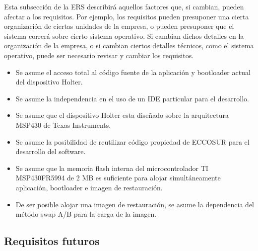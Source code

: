 \documentclass[12pt,a4paper]{article}
\begin{document}
Esta subsección de la ERS describirá aquellos factores que, si
cambian, pueden afectar a los requisitos. Por ejemplo, los
requisitos pueden presuponer una cierta organización de ciertas
unidades de la empresa, o pueden presuponer que  el sistema correrá
sobre cierto sistema operativo. Si cambian dichos detalles en la
organización de la empresa, o si cambian ciertos detalles técnicos,
como el sistema operativo, puede ser necesario revisar y cambiar los
requisitos.

\begin{itemize}
	\item Se asume el acceso total al código fuente de la aplicación y bootloader actual del dispositivo Holter.
	
	\item Se asume la independencia en el uso de un IDE particular para el desarrollo.

	\item Se asume que el dispositivo Holter esta diseñado sobre la arquitectura MSP430 de Texas Instruments.

	\item Se asume la posibilidad de reutilizar código propiedad de ECCOSUR para el desarrollo del software.

	\item Se asume que la memoria flash interna del microcontrolador TI MSP430FR5994 de 2 MB es suficiente para alojar simultáneamente aplicación, bootloader e imagen de restauración.

	\item De ser posible alojar una imagen de restauración, se asume la dependencia del método swap A/B para la carga de la imagen.
\end{itemize}


\subsection{Requisitos futuros}
\label{sec:future_requirements}
\end{document}
